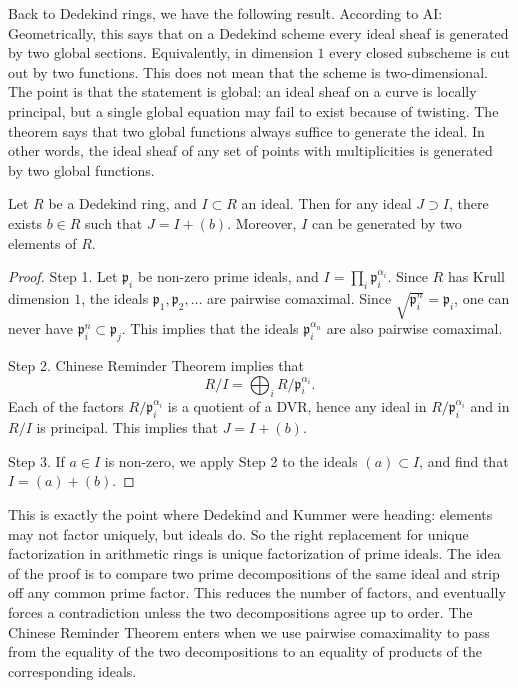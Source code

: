 \medskip\noindent
Back to Dedekind rings,
we have the following result.
According to AI:
Geometrically, this says that on a
Dedekind scheme every ideal sheaf is
generated by two global sections.
Equivalently, in dimension $1$ every
closed subscheme is cut out by two
functions.
This does not mean that the scheme is
two-dimensional.
The point is that the statement is
global: an ideal sheaf on a curve is
locally principal, but a single global
equation may fail to exist because of
twisting.
The theorem says that two global
functions always suffice to generate
the ideal. In other words, the ideal
sheaf of any set of points with
multiplicities is generated by two
global functions.

\begin{theorem}
\label{theorem-dedekind-ideals-two-generators}
Let $R$ be a Dedekind ring, and
$I\subset R$ an ideal.
Then for any ideal $J\supset I$, there
exists $b\in R$ such that $J=I+(b)$.
Moreover, $I$ can be generated by two
elements of $R$.
\end{theorem}

\begin{proof}
Step 1. Let $\mathfrak{p}_i$ be non-zero
prime ideals, and
$I=\prod_i \mathfrak{p}_i^{\alpha_i}$.
Since $R$ has Krull dimension $1$, the
ideals $\mathfrak{p}_1,\mathfrak{p}_2,\dots$
are pairwise comaximal.
Since $\sqrt{\mathfrak{p}_i^n}=\mathfrak{p}_i$,
one can never have
$\mathfrak{p}_i^n\subset \mathfrak{p}_j$.
This implies that the ideals
$\mathfrak{p}_i^{\alpha_n}$ are also
pairwise comaximal.

Step 2. Chinese Reminder Theorem implies
that
$$
R/I=\bigoplus_i R/\mathfrak{p}_i^{\alpha_i}.
$$
Each of the factors
$R/\mathfrak{p}_i^{\alpha_i}$ is a quotient
of a DVR, hence any ideal in
$R/\mathfrak{p}_i^{\alpha_i}$ and in $R/I$
is principal.
This implies that $J=I+(b)$.

Step 3. If $a\in I$ is non-zero, we apply
Step 2 to the ideals $(a)\subset I$, and
find that $I=(a)+(b)$.
\end{proof}

\medskip\noindent
This is exactly the point where Dedekind
and Kummer were heading: elements may not
factor uniquely, but ideals do.
So the right replacement for unique
factorization in arithmetic rings is
unique factorization of prime ideals.
The idea of the proof is to compare two
prime decompositions of the same ideal
and strip off any common prime factor.
This reduces the number of factors, and
eventually forces a contradiction unless
the two decompositions agree up to order.
The Chinese Reminder Theorem enters when
we use pairwise comaximality to pass from
the equality of the two decompositions to
an equality of products of the
corresponding ideals.

